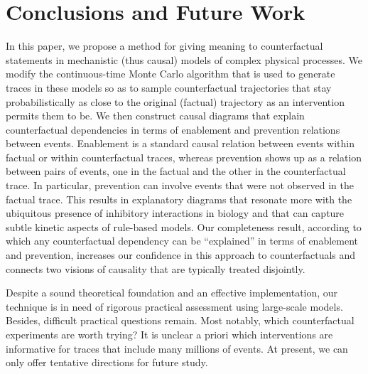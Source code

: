 
\section*{Conclusions and Future Work}

In this paper, we propose a method for giving meaning to
counterfactual statements in mechanistic (thus causal) models of
complex physical processes.  We modify the continuous-time Monte Carlo
algorithm that is used to generate traces in these models so as to
sample counterfactual trajectories that stay probabilistically as
close to the original (factual) trajectory as an intervention permits
them to be. We then construct causal diagrams that explain
counterfactual dependencies in terms of enablement and prevention
relations between events. Enablement is a standard causal relation
between events within factual or within counterfactual traces, whereas
prevention shows up as a relation between pairs of events, one in the
factual and the other in the counterfactual trace. In particular,
prevention can involve events that were not observed in the factual
trace. This results in explanatory diagrams that resonate more with
the ubiquitous presence of inhibitory interactions in biology and that
can capture subtle kinetic aspects of rule-based models.  Our
completeness result, according to which any counterfactual dependency
can be ``explained'' in terms of enablement and prevention, increases
our confidence in this approach to counterfactuals and connects two
visions of causality that are typically treated disjointly.

Despite a sound theoretical foundation and an effective
implementation, our technique is in need of rigorous practical
assessment using large-scale models. Besides, difficult practical
questions remain. Most notably, which counterfactual experiments are
worth trying? It is unclear a priori which interventions are
informative for traces that include many millions of events. At
present, we can only offer tentative directions for future study.

